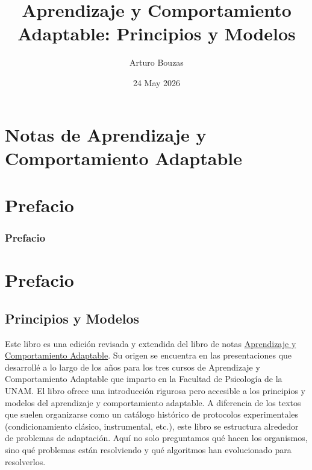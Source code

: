 \documentclass[
  letterpaper,
  DIV=11,
  numbers=noendperiod]{scrreprt}
\title{Aprendizaje y Comportamiento Adaptable: Principios y Modelos}
\author{Arturo Bouzas}
\date{24 May 2026}
\renewcommand*\contentsname{Table of contents}
\newcommand\contentsname{Table of contents}
\begin{document}
\maketitle

\renewcommand*\contentsname{En esta página}
{
\setcounter{tocdepth}{2}
\tableofcontents
}


\chapter{Notas de Aprendizaje y Comportamiento
Adaptable}\label{notas-de-aprendizaje-y-comportamiento-adaptable}


\chapter*{Prefacio}\label{prefacio}


\subsection{Prefacio}\label{prefacio-1}


\chapter{Prefacio}\label{prefacio-2}

\section{Principios y Modelos}\label{principios-y-modelos}

Este libro es una edición revisada y extendida del libro de notas
\href{https://arbouria.github.io/Notas-Aprendizaje-y-Comportamiento-Adaptable-I/}{Aprendizaje
y Comportamiento Adaptable}. Su origen se encuentra en las
presentaciones que desarrollé a lo largo de los años para los tres
cursos de Aprendizaje y Comportamiento Adaptable que imparto en la
Facultad de Psicología de la UNAM. El libro ofrece una introducción
rigurosa pero accesible a los principios y modelos del aprendizaje y
comportamiento adaptable. A diferencia de los textos que suelen
organizarse como un catálogo histórico de protocolos experimentales
(condicionamiento clásico, instrumental, etc.), este libro se estructura
alrededor de problemas de adaptación. Aquí no solo preguntamos qué hacen
los organismos, sino qué problemas están resolviendo y qué algoritmos
han evolucionado para resolverlos.
\end{document}
